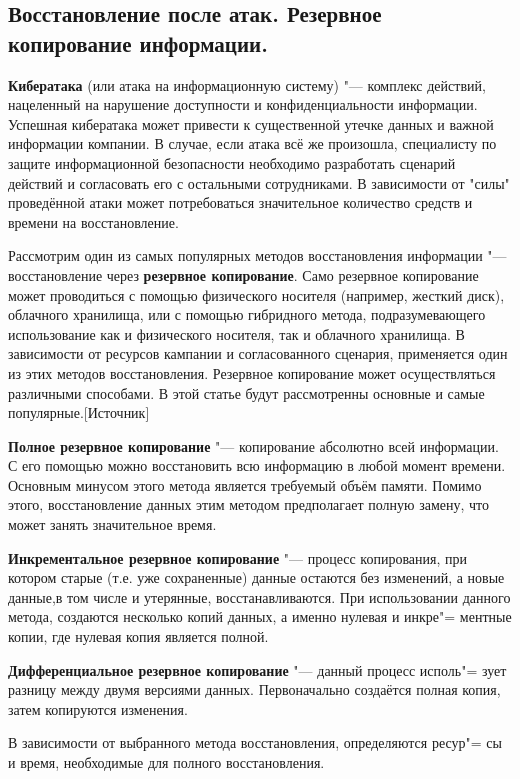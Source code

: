 \newpage
\subsection{Восстановление после атак. Резервное копирование информации.}
    \textbf{Кибератака} (или атака на информационную систему) "--- комплекс действий, нацеленный на нарушение доступности и конфиденциальности информации.
    Успешная кибератака может привести к существенной утечке данных и важной информации компании.
    В случае, если атака всё же произошла, специалисту по защите информационной безопасности необходимо разработать сценарий действий и согласовать его 
    с остальными сотрудниками. В зависимости от "силы" проведённой атаки может потребоваться значительное количество средств и времени на восстановление.

    Рассмотрим один из самых популярных методов восстановления информации "--- восстановление через \textbf{резервное копирование}. Само резервное копирование 
    может проводиться с помощью физического носителя (например, жесткий диск), облачного хранилища, или с помощью гибридного метода, подразумевающего использование
    как и физического носителя, так и облачного хранилища. В зависимости от ресурсов кампании и согласованного сценария, применяется один из этих методов восстановления.
    Резервное копирование может осуществляться различными способами. В этой статье будут рассмотренны основные и самые популярные.[Источник]

    \textbf{Полное резервное копирование} "--- копирование абсолютно всей информации. С его помощью можно восстановить всю информацию в любой момент времени. Основным минусом
    этого метода является требуемый объём памяти. Помимо этого, восстановление данных этим методом предполагает полную замену, что может занять значительное время.

    \textbf{Инкрементальное резервное копирование} "--- процесс копирования, при котором старые (т.е. уже сохраненные) данные остаются без изменений, а новые данные,в том числе и утерянные, 
    восстанавливаются. При использовании данного метода, создаются несколько копий данных, а именно нулевая и инкре"=
    ментные копии, где нулевая копия является полной.

    \textbf{Дифференциальное резервное копирование} "--- данный процесс исполь"=
    зует разницу между двумя версиями данных. Первоначально создаётся полная копия, затем копируются изменения.

    В зависимости от выбранного метода восстановления, определяются ресур"=
    сы и время, необходимые для полного восстановления.


